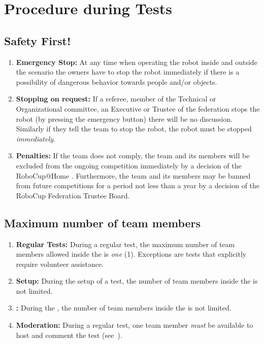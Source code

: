 \section{Procedure during Tests}

\subsection{Safety First!}
\label{rule:safetyfirst}
\begin{enumerate}
	\item \textbf{Emergency Stop:} At any time when operating the robot inside and outside the scenario the owners have to stop the robot immediately if there is a possibility of dangerous behavior towards people and/or objects.
	\item \textbf{Stopping on request:} If a referee, member of the Technical or Organizational committee, an Executive or Trustee of the federation stops the robot (by pressing the emergency button) there will be no discussion. Similarly if they tell the team to stop the robot, the robot must be stopped \emph{immediately}.
	\item \textbf{Penalties:} If the team does not comply, the team and its members will be excluded from the ongoing competition immediately by a decision of the RoboCup@Home . 	Furthermore, the team and its members may be banned from future competitions for a period not less than a year by a decision of the RoboCup Federation Trustee Board.
\end{enumerate}

\subsection{Maximum number of team members}
\label{rule:number_of_people}
\begin{enumerate}
	\item \textbf{Regular Tests:} During a regular test, the maximum number of team members allowed inside the \Arena{} is \emph{one} (1).
	Exceptions are tests that explicitly require volunteer assistance.
	\item \textbf{Setup:} During the setup of a test, the number of team members inside the \Arena{} is not limited.
	\item \textbf{\FINAL:} During the \FINAL, the number of team members inside the \Arena{} is not limited.
	\item \textbf{Moderation:} During a regular test, one team member \emph{must} be available to host and comment the test (see~).
\end{enumerate}

